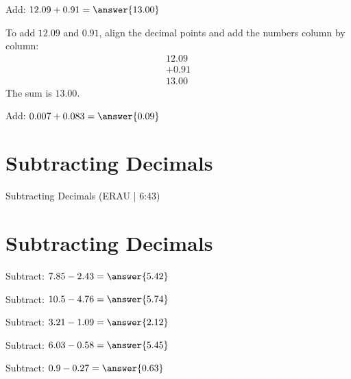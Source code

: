 \documentclass{ximera}
\begin{document}
\begin{problem}
Add: $12.09 + 0.91 = \answer{13.00}$
\begin{feedback}
To add $12.09$ and $0.91$, align the decimal points and add the numbers column by column:
\begin{align*}
  12.09 \\
+  0.91 \\
\hline
  13.00
\end{align*}
The sum is $13.00$.
\end{feedback}
\end{problem}

\begin{problem}
Add: $0.007 + 0.083 = \answer{0.09}$
\end{problem}


\section*{Subtracting Decimals}

Subtracting Decimals (ERAU | 6:43)



\section*{Subtracting Decimals} 

\begin{problem}
Subtract: $7.85 - 2.43 = \answer{5.42}$
\end{problem}

\begin{problem}
Subtract: $10.5 - 4.76 = \answer{5.74}$
\end{problem}

\begin{problem}
Subtract: $3.21 - 1.09 = \answer{2.12}$
\end{problem}

\begin{problem}
Subtract: $6.03 - 0.58 = \answer{5.45}$
\end{problem}

\begin{problem}
Subtract: $0.9 - 0.27 = \answer{0.63}$
\end{problem}

\end{document}
